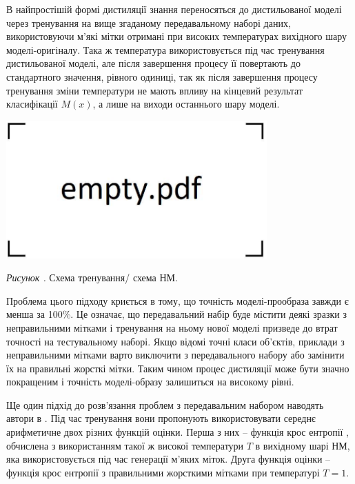 \documentclass[14pt,a4paper]{extarticle}
\newcounter{e}
\newcounter{pic}
\newcommand{\pic}[1]{\refstepcounter{pic} \vspace{-0.3cm}\textit{Рисунок \arabic{pic}\label{#1}.}}
\numberwithin{equation}{section}
\numberwithin{figure}{section}
\begin{document}
 В найпростішій формі дистиляції знання переносяться до дистильованої моделі через тренування на вище згаданому передавальному наборі даних, використовуючи м'які мітки отримані при високих температурах вихідного шару моделі-оригіналу. Така ж температура використовується під час тренування дистильованої моделі, але після завершення процесу її повертають до стандартного значення, рівного одиниці, так як після завершення процесу тренування зміни температури не мають впливу на кінцевий результат класифікації $M(x)$, а лише на виходи останнього шару моделі.
 
 \begin{center}
 	\includegraphics[width=10cm]{../images/empty.pdf}
 \end{center}
 \begin{center}
 	\pic{distilation} Схема тренування/ схема НМ.
 \end{center}
 
 Проблема цього підходу криється в тому, що точність моделі-прообраза завжди є менша за 100\%. Це означає, що передавальний набір буде містити деякі зразки з неправильними мітками і тренування на ньому нової моделі призведе до втрат точності на тестувальному наборі. Якщо відомі точні класи об'єктів, приклади з неправильними мітками варто виключити з передавального набору або замінити їх на правильні жорсткі мітки. Таким чином процес дистиляції може бути значно покращеним і точність моделі-образу залишиться на високому рівні.
 
 Ще один підхід до розв'язання проблем з передавальним набором наводять автори в \cite{distillation}. Під час тренування вони пропонують використовувати середнє арифметичне двох різних функцій оцінки. Перша з них -- функція крос ентропії 
 , обчислена з використанням такої ж високої температури $T$ в вихідному шарі НМ, яка використовується під час генерації м'яких міток. Друга функція оцінки -- функція крос ентропії з правильними жорсткими мітками при температурі $T=1$.
 
 
\end{document}
